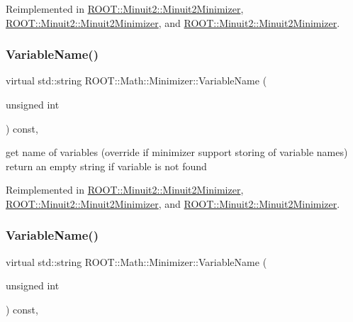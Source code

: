 Reimplemented in \mbox{\hyperlink{classROOT_1_1Minuit2_1_1Minuit2Minimizer_a8f5a6dc65fdfeb0351039d80f7c94968}{R\+O\+O\+T\+::\+Minuit2\+::\+Minuit2\+Minimizer}}, \mbox{\hyperlink{classROOT_1_1Minuit2_1_1Minuit2Minimizer_a8f5a6dc65fdfeb0351039d80f7c94968}{R\+O\+O\+T\+::\+Minuit2\+::\+Minuit2\+Minimizer}}, and \mbox{\hyperlink{classROOT_1_1Minuit2_1_1Minuit2Minimizer_a8f5a6dc65fdfeb0351039d80f7c94968}{R\+O\+O\+T\+::\+Minuit2\+::\+Minuit2\+Minimizer}}.

\mbox{\label{classROOT_1_1Math_1_1Minimizer_a4d6a3c9c95608b35a25f16afd50690ad}} 
\subsubsection{\texorpdfstring{VariableName()}{VariableName()}\hspace{0.1cm}{\footnotesize\ttfamily [2/3]}}
{\footnotesize\ttfamily virtual std\+::string R\+O\+O\+T\+::\+Math\+::\+Minimizer\+::\+Variable\+Name (\begin{DoxyParamCaption}\item[{unsigned int}]{ }\end{DoxyParamCaption}) const\hspace{0.3cm}{\ttfamily [inline]}, {\ttfamily [virtual]}}

get name of variables (override if minimizer support storing of variable names) return an empty string if variable is not found 

Reimplemented in \mbox{\hyperlink{classROOT_1_1Minuit2_1_1Minuit2Minimizer_a8f5a6dc65fdfeb0351039d80f7c94968}{R\+O\+O\+T\+::\+Minuit2\+::\+Minuit2\+Minimizer}}, \mbox{\hyperlink{classROOT_1_1Minuit2_1_1Minuit2Minimizer_a8f5a6dc65fdfeb0351039d80f7c94968}{R\+O\+O\+T\+::\+Minuit2\+::\+Minuit2\+Minimizer}}, and \mbox{\hyperlink{classROOT_1_1Minuit2_1_1Minuit2Minimizer_a8f5a6dc65fdfeb0351039d80f7c94968}{R\+O\+O\+T\+::\+Minuit2\+::\+Minuit2\+Minimizer}}.

\mbox{\label{classROOT_1_1Math_1_1Minimizer_a4d6a3c9c95608b35a25f16afd50690ad}} 
\subsubsection{\texorpdfstring{VariableName()}{VariableName()}\hspace{0.1cm}{\footnotesize\ttfamily [3/3]}}
{\footnotesize\ttfamily virtual std\+::string R\+O\+O\+T\+::\+Math\+::\+Minimizer\+::\+Variable\+Name (\begin{DoxyParamCaption}\item[{unsigned int}]{ }\end{DoxyParamCaption}) const\hspace{0.3cm}{\ttfamily [inline]}, {\ttfamily [virtual]}}


